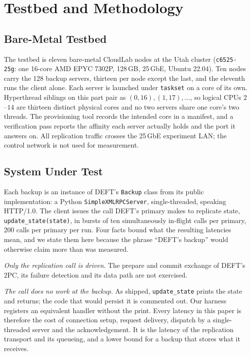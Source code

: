 \documentclass[journal]{IEEEtran}
\begin{document}
\section{Testbed and Methodology}
\label{sec:methodology}

\subsection{Bare-Metal Testbed}
\label{sec:testbed}

The testbed is eleven bare-metal CloudLab nodes at the Utah cluster
(\texttt{c6525-25g}: one 16-core AMD EPYC 7302P, 128\,GB, 25\,GbE, Ubuntu
22.04). Ten nodes carry the 128 backup servers, thirteen per node except the
last, and the eleventh runs the client alone. Each server is launched under
\texttt{taskset} on a core of its own. Hyperthread siblings on this part pair as
$(0,16), (1,17), \dots$, so logical CPUs $2$--$14$ are thirteen distinct
physical cores and no two servers share one core's two threads. The provisioning
tool records the intended core in a manifest, and a verification pass reports
the affinity each server actually holds and the port it answers on. All
replication traffic crosses the 25\,GbE experiment LAN; the control network is
not used for measurement.

\subsection{System Under Test}
\label{sec:sut}

Each backup is an instance of DEFT's \texttt{Backup} class from its public
implementation: a Python \texttt{SimpleXMLRPCServer}, single-threaded, speaking
HTTP/1.0. The client issues the call DEFT's primary makes to replicate state,
\texttt{update\_state(state)}, in bursts of ten simultaneously in-flight calls
per primary, 200 calls per primary per run. Four facts bound what the resulting
latencies mean, and we state them here because the phrase ``DEFT's backup''
would otherwise claim more than was measured.

\emph{Only the replication call is driven.} The prepare and commit exchange of
DEFT's 2PC, its failure detection and its data path are not exercised.

\emph{The call does no work at the backup.} As shipped,
\texttt{update\_state} prints the state and returns; the code that would persist
it is commented out. Our harness registers an equivalent handler without the
print. Every latency in this paper is therefore the cost of connection setup,
request delivery, dispatch by a single-threaded server and the acknowledgement.
It is the latency of the replication transport and its queueing, and a lower
bound for a backup that stores what it receives.
\end{document}
